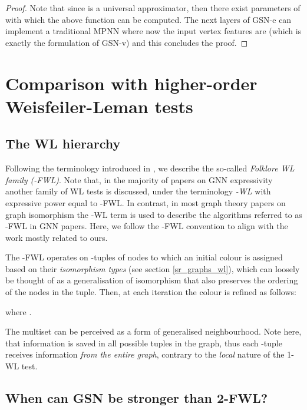 \documentclass{article} \usepackage{iclr2021_conference,times}
\begin{document}
\begin{proof}
Note that since  is a universal approximator, then there exist parameters of  with which the above function can be computed. The next  layers of GSN-e can implement a traditional MPNN where now the input vertex features are  (which is exactly the formulation of GSN-v) and this concludes the proof. 

\end{proof}




\section{Comparison with higher-order Weisfeiler-Leman tests}\label{k-wl-comparison}

\subsection{The WL hierarchy}\label{k-wl}

Following the terminology introduced in \cite{maron2019provably}, we describe the so-called {\em Folklore WL family (-FWL)}. Note that, in the majority of papers on GNN expressivity \citep{morris2019weisfeiler, maron2019provably, chen2020can} another family of WL tests is discussed, under the terminology \textit{-WL} with expressive power equal to -FWL. In contrast, in most graph theory papers on graph isomorphism \citep{DBLP:journals/combinatorica/CaiFI92, furer2017combinatorial, DBLP:conf/fct/ArvindFKV19} the -WL term is used to describe the algorithms referred to as -FWL in GNN papers. Here, we follow the -FWL convention to align with the work mostly related to ours.

The -FWL operates on -tuples of nodes  to which an initial colour  is assigned based on their \textit{isomorphism types} (see section \ref{sr_graphs_wl}), which can loosely be thought of as a generalisation of isomorphism that also preserves the ordering of the nodes in the tuple. Then, at each iteration the colour is refined as follows:

where . 

The multiset  can be perceived as a form of generalised neighbourhood. Note here, that information is saved in all possible tuples in the graph, thus each -tuple receives information {\em from the entire graph}, contrary to the {\em local} nature of the 1-WL test. 

\subsection{When can GSN be stronger than 2-FWL?}\label{gsn_vs_2fwl}
\end{document}
